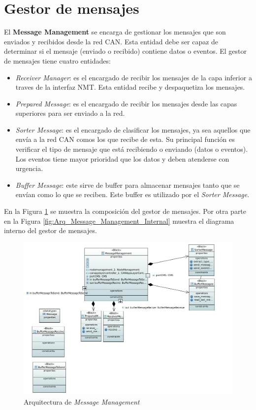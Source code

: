\section{Gestor de mensajes}
El \textbf{Message Management} se encarga de gestionar los mensajes que son
enviados y recibidos desde la red CAN. Esta entidad debe ser capaz de determinar
si el mensaje (enviado o recibido) contiene datos o eventos. El gestor de
mensajes tiene cuatro entidades:
\begin{itemize}
\item \textit{Receiver Manager}: es el encargado de recibir los mensajes de la
  capa inferior a traves de la interfaz NMT. Esta entidad recibe y despaquetiza
  los mensajes.
\item \textit{Prepared Message}: es el encargado de recibir los mensajes desde
  las capas superiores para ser enviado a la red.
\item \textit{Sorter Message}: es el encargado de clasificar los mensajes,
  ya sea aquellos que envía a la red CAN comos los que recibe de esta. Su
  principal función es verificar  el tipo de mensaje que está recibiendo o
  enviando (datos o eventos). Los eventos tiene mayor prioridad que los datos
  y deben atenderse con urgencia.
\item \textit{Buffer Message}: este sirve de buffer para almacenar mensajes
  tanto que se envían como lo que se reciben. Este buffer es utilizado por el
  \textit{Sorter Message}.
\end{itemize}

En la Figura \ref{fig:Arq_Message_Management} se muestra la composición del
gestor de mensajes. Por otra parte en la Figura
\ref{fig:Arq_Message_Management_Internal} muestra el diagrama interno del
gestor de mensajes.

\begin{figure}[h!]
 \centering
 \includegraphics[scale=0.4]{images/Secciones/AppendixA/MessageManagement.JPG}
  \caption{Arquitectura de \textit{Message Management}}
\label{fig:Arq_Message_Management}
\end{figure}

